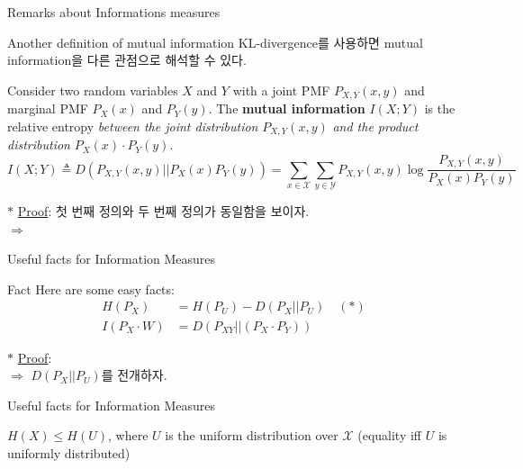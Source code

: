 \documentclass[9pt]{beamer}
\begin{document}
    \begin{section}{Remarks about Informations measures}
        \begin{frame}{Another definition of mutual information}
            KL-divergence를 사용하면 mutual information을 다른 관점으로 해석할 수 있다.
            \begin{definition}
                Consider two random variables $X$ and $Y$ with a joint PMF $P_{X,Y}(x, y)$ and marginal PMF $P_X(x)$ and $P_Y(y)$.
                The \textbf{mutual information} $I (X; Y )$ is the relative entropy \textit{between the joint distribution} $P_{X,Y}(x,y)$ \textit{and the product distribution} $P_X(x)\cdot P_Y(y)$.
                $$I(X;Y) \triangleq D(P_{X,Y}(x,y) || P_{X}(x)P_Y(y)) = \sum_{x \in \mathcal X} \sum_{y \in \mathcal Y} P_{X,Y}(x,y) \log \frac{P_{X,Y}(x,y)}{P_X(x) P_Y(y)}$$
            \end{definition}
            
            $\ast$ \underline{Proof}: 첫 번째 정의와 두 번째 정의가 동일함을 보이자.
            \\ $\Rightarrow$
            \vspace{3cm}
        
        \end{frame}
        
        \begin{frame}{Useful facts for Information Measures}
            \begin{alertblock}{Fact}
                Here are some easy facts:
                \begin{align*} 
                    H(P_X) &= H(P_U) - D(P_X || P_U) \quad (\ast) \\
                    I(P_X \cdot W) &= D(P_{XY} || (P_X \cdot P_Y))
                \end{align*}
            \end{alertblock}

            $\ast$ \underline{Proof}:
            \\$\Rightarrow$ $D(P_X || P_U)$를 전개하자.
            \vspace{3.5cm}
        \end{frame}

        \begin{frame}{Useful facts for Information Measures}
            \begin{corollary}
                $H(X) \le H(U)$, where $U$ is the uniform distribution over $\mathcal X$ (equality iff $U$ is uniformly distributed)
            \end{corollary}


\end{frame}
\end{section}
\end{document}
